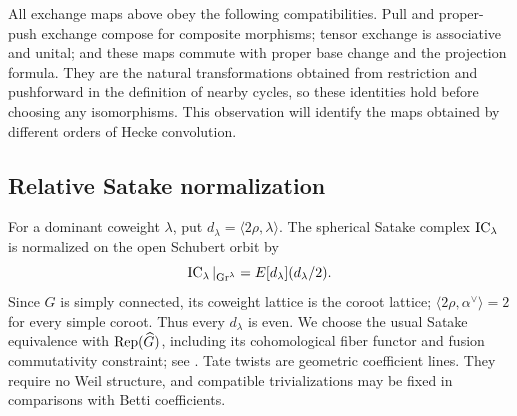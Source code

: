 All exchange maps above obey the following compatibilities.  Pull and
proper-push exchange compose for composite morphisms; tensor exchange is
associative and unital; and these maps commute with proper base change and
the projection formula.  They are the natural transformations obtained
from restriction and pushforward in the definition of nearby cycles, so
these identities hold before choosing any isomorphisms.  This observation
will identify the maps obtained by different orders of Hecke convolution.

\subsection{Relative Satake normalization}

For a dominant coweight $\lambda$, put
$d_\lambda=\langle2\rho,\lambda\rangle$.  The spherical Satake complex
$\operatorname{IC}_\lambda$ is normalized on the open Schubert orbit by
\begin{equation}\label{eq:found-satake-normalization}
               \operatorname{IC}_\lambda|_{\operatorname{Gr}^\lambda}
                         =E[d_\lambda](d_\lambda/2).
\end{equation}
Since $G$ is simply connected, its coweight lattice is the coroot lattice;
$\langle2\rho,\alpha^\vee\rangle=2$ for every simple coroot.  Thus every
$d_\lambda$ is even.  We choose the usual Satake equivalence with
$\operatorname{Rep}(\widehat G)$, including its cohomological fiber functor and fusion
commutativity constraint; see \cite[\S\S4--6 and Theorem~14.1]{MV}.
Tate twists are geometric coefficient lines.  They require no Weil
structure, and compatible trivializations may be fixed in comparisons
with Betti coefficients.

